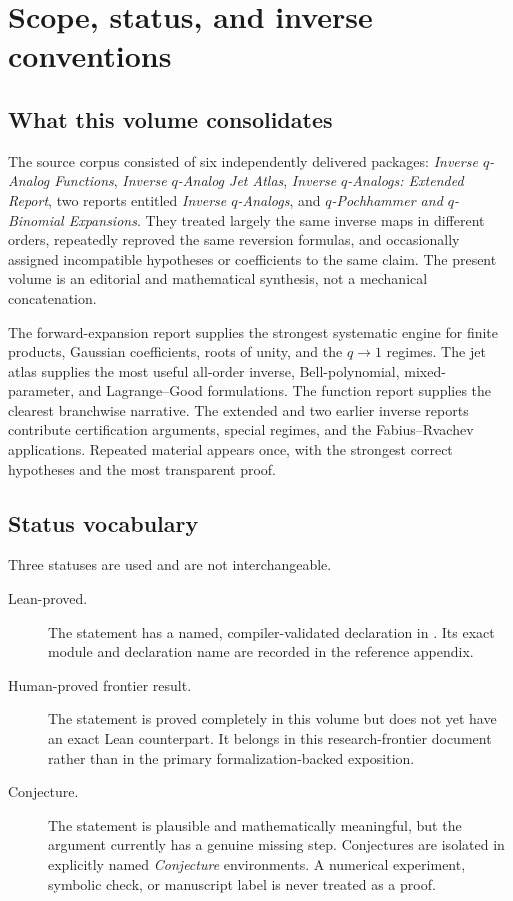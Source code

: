 \chapter{Scope, status, and inverse conventions}
\label{chap:inverse-scope-status}

\section{What this volume consolidates}
\label{sec:scope}

The source corpus consisted of six independently delivered packages:
\emph{Inverse \(q\)-Analog Functions},
\emph{Inverse \(q\)-Analog Jet Atlas},
\emph{Inverse \(q\)-Analogs: Extended Report},
two reports entitled \emph{Inverse \(q\)-Analogs}, and
\emph{\(q\)-Pochhammer and \(q\)-Binomial Expansions}.  They treated largely
the same inverse maps in different orders, repeatedly reproved the same
reversion formulas, and occasionally assigned incompatible hypotheses or
coefficients to the same claim.  The present volume is an editorial and
mathematical synthesis, not a mechanical concatenation.

The forward-expansion report supplies the strongest systematic engine for
finite products, Gaussian coefficients, roots of unity, and the
\(q\to1\) regimes.  The jet atlas supplies the most useful all-order inverse,
Bell-polynomial, mixed-parameter, and Lagrange--Good formulations.  The
function report supplies the clearest branchwise narrative.  The extended and
two earlier inverse reports contribute certification arguments, special
regimes, and the Fabius--Rvachev applications.  Repeated material appears once,
with the strongest correct hypotheses and the most transparent proof.

\section{Status vocabulary}
\label{sec:status-vocabulary}

Three statuses are used and are not interchangeable.

\begin{description}
\item[Lean-proved.]
The statement has a named, compiler-validated declaration in
\repo.  Its exact module and declaration name are recorded in the reference
appendix.
\item[Human-proved frontier result.]
The statement is proved completely in this volume but does not yet have an
exact Lean counterpart.  It belongs in this research-frontier document rather
than in the primary formalization-backed exposition.
\item[Conjecture.]
The statement is plausible and mathematically meaningful, but the argument
currently has a genuine missing step.  Conjectures are isolated in explicitly
named \emph{Conjecture} environments.  A numerical experiment, symbolic check,
or manuscript label is never treated as a proof.
\end{description}

